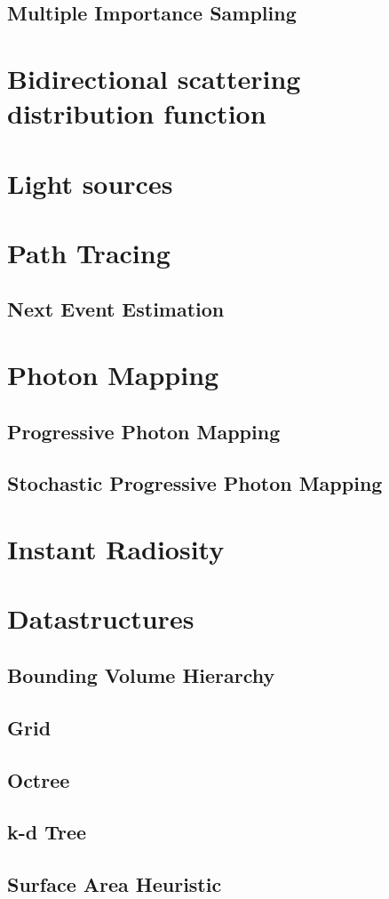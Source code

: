\subsection{Multiple Importance Sampling}

\section{Bidirectional scattering distribution function}


\section{Light sources}


\section{Path Tracing}
\subsection{Next Event Estimation}



\section{Photon Mapping}

\subsection{Progressive Photon Mapping}

\subsection{Stochastic Progressive Photon Mapping}



\section{Instant Radiosity}

\section{Datastructures}


\subsection{Bounding Volume Hierarchy}
\subsection{Grid}
\subsection{Octree}
\subsection{k-d Tree}
\subsection{Surface Area Heuristic}

